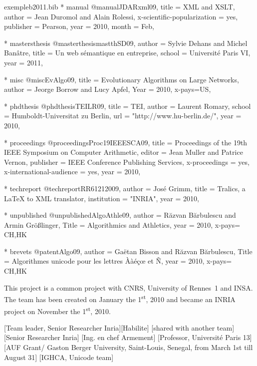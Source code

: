 \documentclass{ra2011}
\begin{document}
\begin{filecontents+}{exempleb2011.bib}
    * manual
@manual{JDARxml09,
title = {XML and XSLT},
author = {Jean Duromol and Alain Rolessi}, 
x-scientific-popularization = {yes}, 
publisher = {Pearson}, 
year = 2010, 
month = {Feb}, 
}


    * mastersthesis
@masterthesis{mastthSD09,
author = {Sylvie Dehans and Michel Banâtre},
title = {Un web sémantique en entreprise}, 
school = {Université Paris VI}, 
year = 2011, 
}


    * misc
@misc{EvAlgo09,
title = {Evolutionary Algorithms on Large Networks}, 
author = {Jeorge Borrow and Lucy Apfel}, 
Year = 2010, 
x-pays={US},
}


    * phdthesis
@phdthesis{TEILR09,
title = {TEI},
author = {Laurent Romary},
school = {Humboldt-Universitat zu Berlin},
url =  "http://www.hu-berlin.de/",
year = 2010, 
}


    * proceedings
@proceedings{Proc19IEEESCA09,
title = {Proceedings of the 19th IEEE Symposium on Computer Arithmetic}, 
editor = {Jean Muller and Patrice Vernon}, 
publisher = {IEEE Conference Publishing Services}, 
x-proceedings = {yes}, 
x-international-audience = {yes}, 
year = 2010, 
}


    * techreport
@techreport{RR61212009,
author = {José Grimm},
title = {Tralics, a LaTeX to XML translator}, 
institution = "INRIA", 
year = 2010, 
}


    * unpublished
@unpublished{AlgoAthle09,
author = {R{\u{a}}zvan B{\u{a}}rbulescu and Armin Größlinger},
Title = {Algorithmics and Athletics},
year = 2010,
x-pays= {CH,HK}
}


   * brevets
@patent{Algo09,
author = {Gaëtan Bisson and Răzvan Bărbulescu},
Title = {Algorithmes unicode pour les lettres Ààéçœ et Ñ},
year = 2010,
x-pays= {CH,HK}
}


\end{filecontents+}

\maketitle


\begin{moreinfo}
  This project is a common project with CNRS, University of Rennes~1 and INSA. The
  team has been created on January the 1\textsuperscript{st}, 2010 and became an
  INRIA project on November the 1\textsuperscript{st}, 2010.
\end{moreinfo}

\begin{composition}
       [Team leader, Senior Researcher Inria][Habilite]
       [shared with another team]
       [Senior Researcher Inria]
       [Ing. en chef Armement]
       [Professor, Université Paris 13]
       [AUF Grant/ Gaston Berger University, Saint-Louis, Senegal, from March 1st till August 31]
       [IGHCA, Unicode team]
\end{composition}
\end{document}
